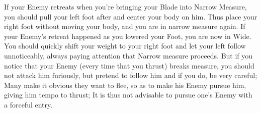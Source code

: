 If your Enemy retreats when you're bringing your Blade into Narrow
Measure, you should pull your left foot after and center your body on
him. Thus place your right foot without moving your body, and you are
in narrow measure again. If your Enemy's retreat happened as you
lowered your Foot, you are now in Wide. You should quickly shift your
weight to your right foot and let your left follow unnoticeably,
always paying attention that Narrow measure proceeds. But if you
notice that your Enemy (every time that you thrust) breaks measure,
you should not attack him furiously, but pretend to follow him and if
you do, be very careful; Many make it obvious they want to flee, so as
to make his Enemy pursue him, giving him tempo to thrust; It is thus
not advisable to pursue one's Enemy with a forceful entry.

